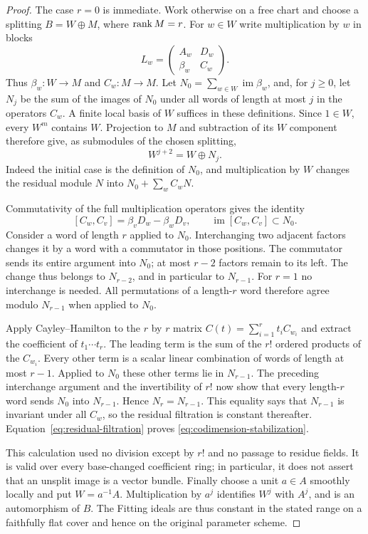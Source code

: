 \begin{proof}
The case $r=0$ is immediate. Work otherwise on a free chart and
choose a splitting $B=W\oplus M$, where $\operatorname{rank} M=r$. For $w\in W$
write multiplication by $w$ in blocks
\[
 L_w=\begin{pmatrix}A_w&D_w\\ \beta_w&C_w\end{pmatrix}.
\]
Thus $\beta_w:W\to M$ and $C_w:M\to M$. Let
$N_0=\sum_{w\in W}\operatorname{im}\beta_w$, and, for $j\ge0$,
let $N_j$ be the sum of the images of $N_0$ under all words of length
at most $j$ in the operators $C_w$. A finite local basis of $W$
suffices in these definitions. Since $1\in W$, every $W^m$ contains
$W$. Projection to $M$ and subtraction of its $W$ component therefore
give, as submodules of the chosen splitting,
\begin{equation}\label{eq:residual-filtration}
 W^{j+2}=W\oplus N_j.
\end{equation}
Indeed the initial case is the definition of $N_0$, and multiplication
by $W$ changes the residual module $N$ into
$N_0+\sum_w C_w N$.

Commutativity of the full multiplication operators gives the identity
\begin{equation}\label{eq:compressed-commutator}
 [C_w,C_v]=\beta_vD_w-\beta_wD_v,
 \qquad \operatorname{im}[C_w,C_v]\subset N_0.
\end{equation}
Consider a word of length $r$ applied to $N_0$. Interchanging two
adjacent factors changes it by a word with a commutator in those
positions. The commutator sends its entire argument into $N_0$;
at most $r-2$ factors remain to its left. The change thus belongs
to $N_{r-2}$, and in particular to $N_{r-1}$. For $r=1$ no
interchange is needed. All permutations of a length-$r$ word
therefore agree modulo $N_{r-1}$ when applied to $N_0$.

Apply Cayley--Hamilton to the $r$ by $r$ matrix
$C(t)=\sum_{i=1}^r t_i C_{w_i}$ and extract the coefficient of
$t_1\cdots t_r$. The leading term is the sum of the $r!$ ordered
products of the $C_{w_i}$. Every other term is a scalar linear
combination of words of length at most $r-1$. Applied to $N_0$
these other terms lie in $N_{r-1}$. The preceding interchange
argument and the invertibility of $r!$ now show that every
length-$r$ word sends $N_0$ into $N_{r-1}$. Hence
$N_r=N_{r-1}$. This equality says that $N_{r-1}$ is invariant under
all $C_w$, so the residual filtration is constant thereafter.
Equation~\eqref{eq:residual-filtration} proves
\eqref{eq:codimension-stabilization}.

This calculation used no division except by $r!$ and no passage
to residue fields. It is valid over every base-changed coefficient
ring; in particular, it does not assert that an unsplit image is a
vector bundle. Finally choose a unit $a\in A$ smoothly locally
and put $W=a^{-1}A$. Multiplication by $a^j$ identifies $W^j$ with
$A^j$, and is an automorphism of $B$. The Fitting ideals are thus
constant in the stated range on a faithfully flat cover and hence
on the original parameter scheme.
\end{proof}

